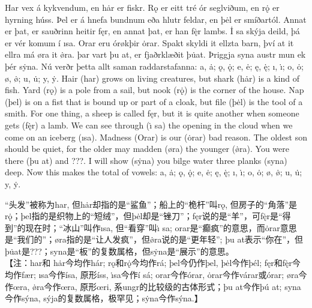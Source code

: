 \begin{paracol}{2}
    Har vex á kykvendum, en hȧr er fiskr. Rǫ er eitt tré ór seglviðum, en rǫ̇ er hyrning húss. Þel er á hnefa bundnum eða hlutr feldar, en þėl er smíðartól. Annat er þat, er sauðrinn heitir fęr, en annat þat, er han fę̇r lambs. İ sa skýja deild, þá er vér komum í ısa. Orar eru órøkþir ȯrar. Spakt skyldi it ellzta barn, því at it ellra má øra it ø̇ra. þar vart þu at, er fjaðrklæðit þu̇at\footnotemark[1]. Þriggja syna austr mun ek þér sẏna. Nú verðr þetta allt saman raddarstafanna: a, ȧ; ǫ, ǫ̇; e, ė; ę, ę̇; ı, ı̇; o, ȯ; ø, ø̇; u, u̇; y, ẏ.
    \switchcolumn
    Hair (har) grows on living creatures, but shark (hȧr) is a kind of fish. Yard (rǫ) is a pole from a sail, but nook (rǫ̇) is the corner of the house. Nap (þel) is on a fist that is bound up or part of a cloak, but file (þėl) is the tool of a smith. For one thing, a sheep is called fęr, but it is quite another when someone gets (fę̇r) a lamb. We can see through (ı̇ sa) the opening in the cloud when we come on an iceberg (ısa). Madness (Orar) is our (ȯrar) bad reason. The oldest son should be quiet, for the older may madden (øra) the younger (ø̇ra). You were there (þu at) and ???. I will show (sẏna) you bilge water three planks (syna) deep. Now this makes the total of vowels: a, ȧ; ǫ, ǫ̇; e, ė; ę, ę̇; ı, ı̇; o, ȯ; ø, ø̇; u, u̇; y, ẏ.
\end{paracol}
\begin{translation*}{}
    “头发”被称为har, 但hȧr却指的是“鲨鱼”；船上的“桅杆”叫rǫ, 但房子的“角落”是rǫ̇；þel指的是织物上的“短绒”，但þėl却是“锉刀”；fęr说的是“羊”，可fę̇r是“得到”的现在时；“冰山”叫作ısa, 但“看穿”叫ı̇ sa; orar是“癫疯”的意思，而ȯrar意思是“我们的”；øra指的是“让人发疯”，但ø̇ra说的是“更年轻”; þu at表示“你在”，但þu̇at是???；syna是“板”的复数属格，但sẏna是“展示”的意思。\\

    【注：har和 h\.{a}r今均作hár; rǫ和r\.{ǫ}今均作rá; þel今仍作þel, þ\.{e}l今作þél; fęr和f\.{ę}r今均作fær; ısa今作ísa, 原形íss, \.{ı}sa今作í sá; orar今作órar, \.{o}rar今作várar或órar; øra今作œra, \.{ø}ra今作œra, 原形œri, 系ungr的比较级的古体形式；þu at今作þú at; syna今作sýna, sýja的复数属格，极罕见；s\.{y}na今作sýna.】
\end{translation*}
